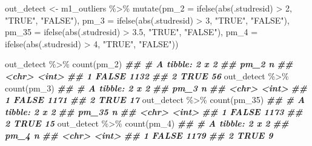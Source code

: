 \documentclass[
]{book}
\newenvironment{Shaded}{\begin{snugshade}}{\end{snugshade}}
\newcommand{\AttributeTok}[1]{\textcolor[rgb]{0.77,0.63,0.00}{#1}}
\newcommand{\DecValTok}[1]{\textcolor[rgb]{0.00,0.00,0.81}{#1}}
\newcommand{\DocumentationTok}[1]{\textcolor[rgb]{0.56,0.35,0.01}{\textbf{\textit{#1}}}}
\newcommand{\FloatTok}[1]{\textcolor[rgb]{0.00,0.00,0.81}{#1}}
\newcommand{\FunctionTok}[1]{\textcolor[rgb]{0.00,0.00,0.00}{#1}}
\newcommand{\NormalTok}[1]{#1}
\newcommand{\OtherTok}[1]{\textcolor[rgb]{0.56,0.35,0.01}{#1}}
\newcommand{\SpecialCharTok}[1]{\textcolor[rgb]{0.00,0.00,0.00}{#1}}
\newcommand{\StringTok}[1]{\textcolor[rgb]{0.31,0.60,0.02}{#1}}
\begin{document}
\begin{Shaded}
\begin{Highlighting}[]
\NormalTok{out\_detect }\OtherTok{\textless{}{-}}\NormalTok{ m1\_outliers }\SpecialCharTok{\%\textgreater{}\%}
  \FunctionTok{mutate}\NormalTok{(}\AttributeTok{pm\_2 =} \FunctionTok{ifelse}\NormalTok{(}\FunctionTok{abs}\NormalTok{(.studresid) }\SpecialCharTok{\textgreater{}} \DecValTok{2}\NormalTok{, }\StringTok{"TRUE"}\NormalTok{, }\StringTok{"FALSE"}\NormalTok{),}
         \AttributeTok{pm\_3 =} \FunctionTok{ifelse}\NormalTok{(}\FunctionTok{abs}\NormalTok{(.studresid) }\SpecialCharTok{\textgreater{}} \DecValTok{3}\NormalTok{, }\StringTok{"TRUE"}\NormalTok{, }\StringTok{"FALSE"}\NormalTok{),}
         \AttributeTok{pm\_35 =} \FunctionTok{ifelse}\NormalTok{(}\FunctionTok{abs}\NormalTok{(.studresid) }\SpecialCharTok{\textgreater{}} \FloatTok{3.5}\NormalTok{, }\StringTok{"TRUE"}\NormalTok{, }\StringTok{"FALSE"}\NormalTok{),}
         \AttributeTok{pm\_4 =} \FunctionTok{ifelse}\NormalTok{(}\FunctionTok{abs}\NormalTok{(.studresid) }\SpecialCharTok{\textgreater{}} \DecValTok{4}\NormalTok{, }\StringTok{"TRUE"}\NormalTok{, }\StringTok{"FALSE"}\NormalTok{))}

\NormalTok{out\_detect }\SpecialCharTok{\%\textgreater{}\%} \FunctionTok{count}\NormalTok{(pm\_2)}
\DocumentationTok{\#\# \# A tibble: 2 x 2}
\DocumentationTok{\#\#   pm\_2      n}
\DocumentationTok{\#\#   \textless{}chr\textgreater{} \textless{}int\textgreater{}}
\DocumentationTok{\#\# 1 FALSE  1132}
\DocumentationTok{\#\# 2 TRUE     56}
\NormalTok{out\_detect }\SpecialCharTok{\%\textgreater{}\%} \FunctionTok{count}\NormalTok{(pm\_3)}
\DocumentationTok{\#\# \# A tibble: 2 x 2}
\DocumentationTok{\#\#   pm\_3      n}
\DocumentationTok{\#\#   \textless{}chr\textgreater{} \textless{}int\textgreater{}}
\DocumentationTok{\#\# 1 FALSE  1171}
\DocumentationTok{\#\# 2 TRUE     17}
\NormalTok{out\_detect }\SpecialCharTok{\%\textgreater{}\%} \FunctionTok{count}\NormalTok{(pm\_35)}
\DocumentationTok{\#\# \# A tibble: 2 x 2}
\DocumentationTok{\#\#   pm\_35     n}
\DocumentationTok{\#\#   \textless{}chr\textgreater{} \textless{}int\textgreater{}}
\DocumentationTok{\#\# 1 FALSE  1173}
\DocumentationTok{\#\# 2 TRUE     15}
\NormalTok{out\_detect }\SpecialCharTok{\%\textgreater{}\%} \FunctionTok{count}\NormalTok{(pm\_4)}
\DocumentationTok{\#\# \# A tibble: 2 x 2}
\DocumentationTok{\#\#   pm\_4      n}
\DocumentationTok{\#\#   \textless{}chr\textgreater{} \textless{}int\textgreater{}}
\DocumentationTok{\#\# 1 FALSE  1179}
\DocumentationTok{\#\# 2 TRUE      9}
\end{Highlighting}
\end{Shaded}
\end{document}

